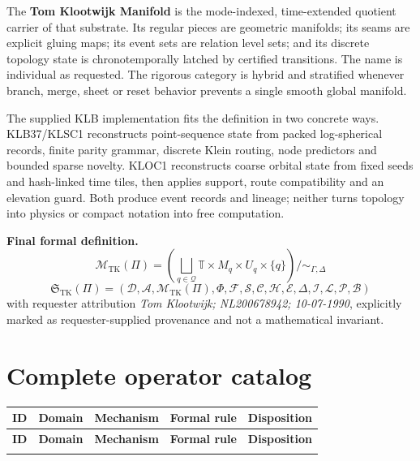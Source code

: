 \documentclass[10pt,a4paper]{article}
\newcommand{\TKM}{\mathcal{M}_{\mathrm{TK}}}
\newcommand{\TKSub}{\mathfrak{S}_{\mathrm{TK}}}
\newcommand{\Time}{\mathbb{T}}
\begin{document}
The \textbf{Tom Klootwijk Manifold} is the mode-indexed, time-extended quotient carrier of that substrate. Its regular pieces are geometric manifolds; its seams are explicit gluing maps; its event sets are relation level sets; and its discrete topology state is chronotemporally latched by certified transitions. The name is individual as requested. The rigorous category is hybrid and stratified whenever branch, merge, sheet or reset behavior prevents a single smooth global manifold.

The supplied KLB implementation fits the definition in two concrete ways. KLB37/KLSC1 reconstructs point-sequence state from packed log-spherical records, finite parity grammar, discrete Klein routing, node predictors and bounded sparse novelty. KLOC1 reconstructs coarse orbital state from fixed seeds and hash-linked time tiles, then applies support, route compatibility and an elevation guard. Both produce event records and lineage; neither turns topology into physics or compact notation into free computation.

\begin{decisionbox}
\textbf{Final formal definition.}
\[
\boxed{
\TKM(\Pi)=
\left(\bigsqcup_{q\in\mathcal Q}\Time\times M_q\times U_q\times\{q\}\right)/\sim_{\Gamma,\Delta}
}
\]
\[
\boxed{
\TKSub(\Pi)=
(\mathcal D,\mathcal A,\TKM(\Pi),\Phi,\mathcal F,\mathcal S,\mathcal C,
\mathcal H,\mathcal E,\Delta,\mathcal I,\mathcal L,\mathcal P,\mathcal B)
}
\]
with requester attribution \emph{Tom Klootwijk; NL200678942; 10-07-1990}, explicitly marked as requester-supplied provenance and not a mathematical invariant.
\end{decisionbox}

\appendix
\clearpage
\section{Complete operator catalog}
\label{app:operators}

\begingroup
\setlength{\tabcolsep}{4pt}
\scriptsize
\begin{longtable}{@{}L{10mm}L{22mm}L{30mm}L{75mm}L{21mm}@{}}
\toprule
\textbf{ID} & \textbf{Domain} & \textbf{Mechanism} & \textbf{Formal rule} & \textbf{Disposition} \\
\midrule
\endfirsthead
\toprule
\textbf{ID} & \textbf{Domain} & \textbf{Mechanism} & \textbf{Formal rule} & \textbf{Disposition} \\
\midrule
\endhead
\bottomrule
\endlastfoot

\end{longtable}
\endgroup
\end{document}
